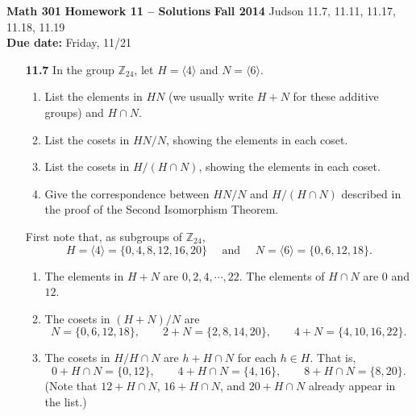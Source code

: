 \documentclass[12pt,reqno]{amsart}
\newcommand{\Z}{\ensuremath{\mathbb{Z}}}
\newcommand{\<}{\ensuremath{\langle}}
\renewcommand{\>}{\ensuremath{\rangle}}
\begin{document}
\thispagestyle{empty}

\noindent \textbf{Math 301} \hskip3cm {\bf Homework 11 -- Solutions} \hfill {\bf Fall 2014}
\vskip1cm
 Judson 11.7, 11.11, 11.17, 11.18, 11.19\\
{\bf Due date:} Friday, 11/21

\bigskip
\begin{enumerate}
\item[{\bf 11.7}] 
In the group ${\mathbb Z}_{24}$, let $H = \langle 4 \rangle$ and $N =
\langle 6 \rangle$. 
\begin{enumerate}
 
 \item
List the elements in $HN$ (we usually write $H + N$ for these additive
groups) and $H \cap N$. 
 
 \item
List the cosets in $HN/N$, showing the elements in each coset.
 
 \item
List the cosets in $H/(H \cap N)$, showing the elements in each coset. 
 
 \item
Give the correspondence between $HN/N$ and $H/(H \cap N)$ described in
the proof of the Second Isomorphism Theorem. 
\end{enumerate}

\bigskip
{}
First note that, as subgroups of $\Z_{24}$,
\[
H = \< 4 \> = \{0, 4, 8, 12, 16, 20\} \quad \text{ and } \quad 
N = \< 6 \> = \{0, 6, 12, 18\}.
\]
\begin{enumerate}
 \item The elements in $H+N$ are $0, 2, 4, \cdots, 22$.
The elements of $H \cap N$ are $0$ and $12$.
 
\medskip 

 \item
The cosets in $(H+N)/N$ are 
\[
N = \{0, 6, 12, 18\},\qquad
2+N = \{2, 8, 14, 20\},\qquad
4+N = \{4, 10, 16, 22\}.
\]

\medskip 

 \item
The cosets in $H/H \cap N$ are $h + H\cap N$ for each $h\in H$.  That is,
\[
0 + H\cap N = \{0, 12\},\qquad  
4 + H\cap N = \{4, 16\},\qquad
8 + H\cap N = \{8, 20\}.
\]
(Note that $12 + H \cap N$, $16 + H \cap N$, and $20 + H \cap N$ already appear
in the list.)
\medskip 


\end{enumerate}
\end{enumerate}
\end{document}
